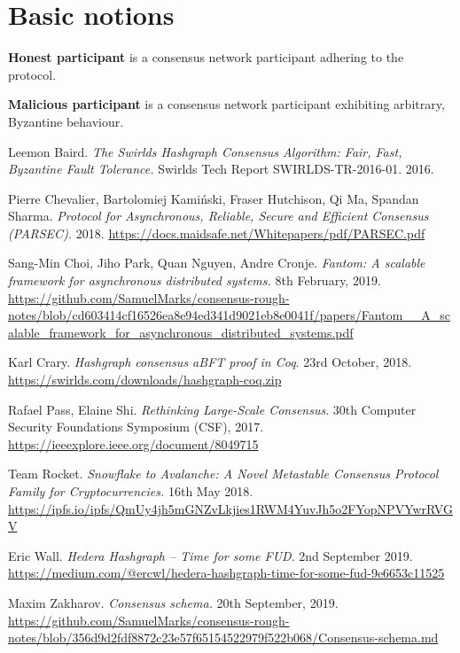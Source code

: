 \documentclass[a4paper,11pt]{article}
\begin{document}
\section{Basic notions}

\textbf{Honest participant} is a consensus network participant adhering to the protocol.

\noindent
\textbf{Malicious participant} is a consensus network participant exhibiting arbitrary, Byzantine behaviour.


\begin{thebibliography}{10}

   Leemon Baird. \emph{The Swirlds Hashgraph Consensus Algorithm: Fair, Fast,
    Byzantine Fault Tolerance.} Swirlds Tech Report SWIRLDS-TR-2016-01. 2016.

   Pierre Chevalier, Bartolomiej Kamiński, Fraser Hutchison, Qi Ma, Spandan
    Sharma. \emph{Protocol for Asynchronous, Reliable, Secure and Efficient Consensus (PARSEC).}
    2018. \url{https://docs.maidsafe.net/Whitepapers/pdf/PARSEC.pdf}

   Sang-Min Choi, Jiho Park, Quan Nguyen, Andre Cronje. \emph{Fantom: A scalable
    framework for asynchronous distributed systems.} 8th February, 2019.
    \url{https://github.com/SamuelMarks/consensus-rough-notes/blob/cd603414cf16526ea8e94ed341d9021eb8e0041f/papers/Fantom__A_scalable_framework_for_asynchronous_distributed_systems.pdf}

   Karl Crary. \emph{Hashgraph consensus aBFT proof in Coq}. 23rd October,
    2018. \url{https://swirlds.com/downloads/hashgraph-coq.zip}

   Rafael Pass, Elaine Shi. \emph{Rethinking Large-Scale Consensus}. 30th
    Computer Security Foundations Symposium (CSF),
    2017. \url{https://ieeexplore.ieee.org/document/8049715}

   Team Rocket. \emph{Snowflake to Avalanche: A Novel Metastable Consensus
    Protocol Family for Cryptocurrencies.} 16th May
    2018. \url{https://ipfs.io/ipfs/QmUy4jh5mGNZvLkjies1RWM4YuvJh5o2FYopNPVYwrRVGV}

   Eric Wall. \emph{Hedera Hashgraph -- Time for some FUD}. 2nd September
    2019.  \url{https://medium.com/@ercwl/hedera-hashgraph-time-for-some-fud-9e6653c11525}

   Maxim Zakharov. \emph{Consensus schema.} 20th September,
    2019. \url{https://github.com/SamuelMarks/consensus-rough-notes/blob/356d9d2fdf8872c23e57f65154522979f522b068/Consensus-schema.md}

\end{thebibliography}
\end{document}
